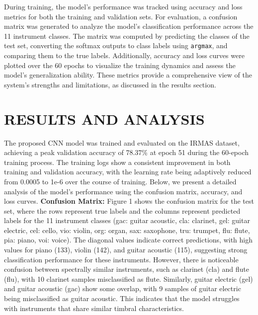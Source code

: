 \documentclass[conference]{IEEEtran}
\begin{document}
During training, the model’s performance was tracked using accuracy and loss metrics for both the training and validation sets. For evaluation, a confusion matrix was generated to analyze the model’s classification performance across the 11 instrument classes. The matrix was computed by predicting the classes of the test set, converting the softmax outputs to class labels using \texttt{argmax}, and comparing them to the true labels. Additionally, accuracy and loss curves were plotted over the 60 epochs to visualize the training dynamics and assess the model’s generalization ability. These metrics provide a comprehensive view of the system’s strengths and limitations, as discussed in the results section. \\[3pt]
\section{ RESULTS AND ANALYSIS}
The proposed CNN model was trained and evaluated on the IRMAS dataset, achieving a peak validation accuracy of 78.37\% at epoch 51 during the 60-epoch training process. The training logs show a consistent improvement in both training and validation accuracy, with the learning rate being adaptively reduced from 0.0005 to 1e-6 over the course of training. Below, we present a detailed analysis of the model’s performance using the confusion matrix, accuracy, and loss curves.
\textbf{Confusion Matrix:} Figure 1 shows the confusion matrix for the test set, where the rows represent true labels and the columns represent predicted labels for the 11 instrument classes (gac: guitar acoustic, cla: clarinet, gel: guitar electric, cel: cello, vio: violin, org: organ, sax: saxophone, tru: trumpet, flu: flute, pia: piano, voi: voice). The diagonal values indicate correct predictions, with high values for piano (133), violin (142), and guitar acoustic (115), suggesting strong classification performance for these instruments. However, there is noticeable confusion between spectrally similar instruments, such as clarinet (cla) and flute (flu), with 10 clarinet samples misclassified as flute. Similarly, guitar electric (gel) and guitar acoustic (gac) show some overlap, with 9 samples of guitar electric being misclassified as guitar acoustic. This indicates that the model struggles with instruments that share similar timbral characteristics.
\end{document}
